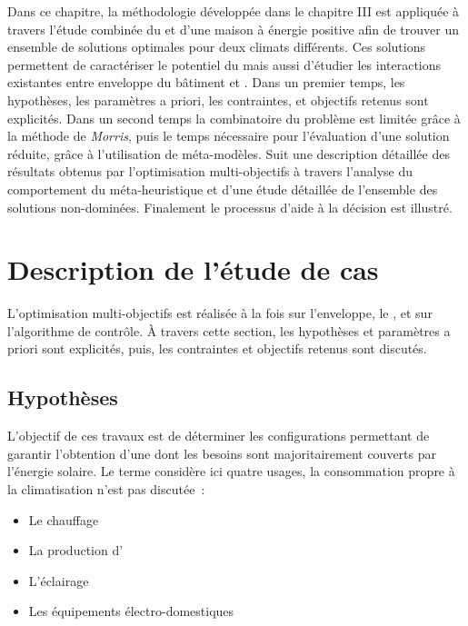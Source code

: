 


Dans ce chapitre, la méthodologie développée dans le chapitre III est appliquée
à travers l’étude combinée du  et d’une maison à énergie positive afin de trouver
un ensemble de solutions optimales pour deux climats différents. Ces solutions permettent de caractériser le potentiel
du  mais aussi d’étudier les interactions existantes entre enveloppe du bâtiment et .
Dans un premier temps, les hypothèses, les paramètres a priori,
les contraintes, et objectifs retenus sont explicités. Dans un second temps la combinatoire
du problème est limitée grâce à la méthode de \textit{Morris}, puis le temps nécessaire
pour l’évaluation d’une solution réduite, grâce à l’utilisation de méta-modèles.
Suit une description détaillée des résultats obtenus par l’optimisation multi-objectifs
à travers l’analyse du comportement du méta-heuristique et d’une étude détaillée
de l’ensemble des solutions non-dominées. Finalement le processus d’aide à la décision est
illustré.
\clearpage


\section{Description de l’étude de cas} %
\label{sec:description_de_l_etude_de_cas}
L’optimisation multi-objectifs est réalisée à la fois sur l’enveloppe, le ,
et sur l’algorithme de contrôle.
À travers cette section, les hypothèses et paramètres a priori sont explicités, puis, les
contraintes et objectifs retenus sont discutés.


\subsection{Hypothèses} %
\label{sub:hypotheses_optimization}
L’objectif de ces travaux est de déterminer les configurations permettant
de garantir l’obtention d’une  dont les besoins sont majoritairement couverts
par l’énergie solaire. Le terme  considère ici quatre usages, la consommation
propre à la climatisation n’est pas discutée~:
\begin{itemize}
  \item Le chauffage
  \item La production d’
  \item L’éclairage
  \item Les équipements électro-domestiques
\end{itemize}

